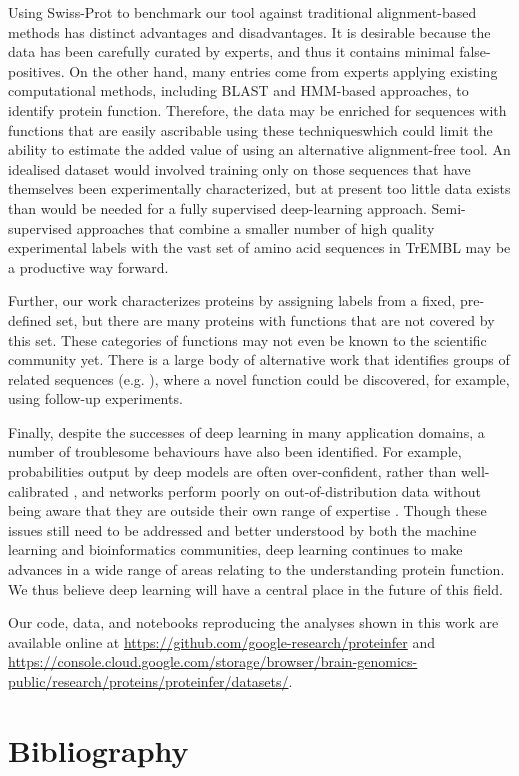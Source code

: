 Using Swiss-Prot to benchmark our tool against traditional alignment-based methods has distinct advantages and disadvantages. It is desirable because the data has been carefully curated by experts, and thus it contains minimal false-positives. On the other hand, many entries come from experts applying existing computational methods, including BLAST and HMM-based approaches, to identify protein function. Therefore, the data may be enriched for sequences with functions that are easily ascribable using these techniqueswhich could limit the ability to estimate the added value of using an alternative alignment-free tool. An idealised dataset would involved training only on those sequences that have themselves been experimentally characterized, but at present  too little data exists than would be needed for a fully supervised deep-learning approach. Semi-supervised approaches that combine a smaller number of high quality experimental labels with the vast set of amino acid sequences in TrEMBL may be a productive way forward.

Further, our work characterizes proteins by assigning labels from a fixed, pre-defined set, but there are many proteins with functions that are not covered by this set. These categories of functions may not even be known to the scientific community yet. There is a large body of alternative work that identifies groups of related sequences (e.g. \cite{pmid12952885}), where a novel function could be discovered, for example, using follow-up experiments.

Finally, despite the successes of deep learning in many application domains, a number of troublesome behaviours have also been identified. For example, probabilities output by deep models are often over-confident, rather than well-calibrated \citep{guo}, and networks perform poorly on out-of-distribution data without being aware that they are outside their own range of expertise \citep{amoidei}. Though these issues still need to be addressed and better understood by both the machine learning and bioinformatics communities, deep learning continues to make advances in a wide range of areas relating to the understanding protein function. We thus believe deep learning will have a central place in the future of this field.



Our code, data, and notebooks reproducing the analyses shown in this work are available online at \url{https://github.com/google-research/proteinfer} and \url{https://console.cloud.google.com/storage/browser/brain-genomics-public/research/proteins/proteinfer/datasets/}.

\section*{Bibliography}




